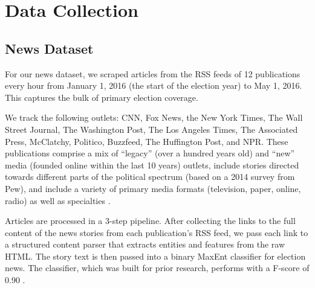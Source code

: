 \documentclass[letterpaper]{article}
\begin{document}
 
\section{Data Collection} 

\subsection{News Dataset}
For our news dataset, we scraped articles from the RSS feeds of 12 publications every hour from January 1, 2016 (the start of the election year) to May 1, 2016. This captures the bulk of primary election coverage.

We track the following outlets: CNN, Fox News, the New York Times, The Wall Street Journal, The Washington Post, The Los Angeles Times, The Associated Press, McClatchy, Politico, Buzzfeed, The Huffington Post, and NPR. These publications comprise a mix of ``legacy'' (over a hundred years old) and ``new'' media (founded online within the last 10 years) outlets, include stories directed towards different parts of the political spectrum (based on a 2014 survey from Pew), and include a variety of primary media formats (television, paper, online, radio) as well as specialties \cite{PoliticalPolarization}.   

Articles are processed in a 3-step pipeline. After collecting the links to the full content of the news stories from each publication's RSS feed, we pass each link to a structured content parser that extracts entities and features from the raw HTML. The story text is then passed into a binary MaxEnt classifier for election news. The classifier, which was built for prior research, performs with a F-score of 0.90 \cite{vijayaraghavan-thesis}. 
\end{document}
